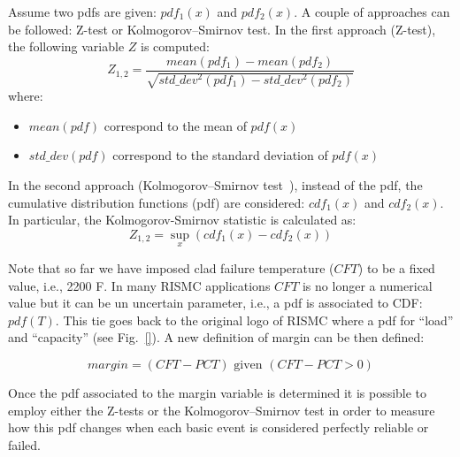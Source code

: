 Assume two pdfs are given: $pdf_1(x)$ and $pdf_2(x)$. A couple of approaches can be followed: Z-test or 
Kolmogorov–Smirnov test. 
In the first approach (Z-test), the following variable $Z$ is computed:
\begin{equation}
  Z_{1,2} = \frac{mean(pdf_1)-mean(pdf_2)}{\sqrt{std\_dev^2 (pdf_1)-std\_dev^2(pdf_2)}} 
  \label{eq:Ztest}
\end{equation}
where:
\begin{itemize}
  \item $mean(pdf)$ correspond to the mean of $pdf(x)$ 
  \item $std\_dev(pdf)$ correspond to the standard deviation of $pdf(x)$ 
\end{itemize}

In the second approach (Kolmogorov–Smirnov test~\cite{}), instead of the pdf, the cumulative 
distribution functions (pdf) are considered: $cdf_1(x)$ and $cdf_2(x)$. 
In particular, the Kolmogorov-Smirnov statistic is calculated as:
\begin{equation}
  Z_{1,2} = \sup_{x} (cdf_1(x) - cdf_2(x))
  \label{eq:Kolmogorov-Smirnov}
\end{equation}

Note that so far we have imposed clad failure temperature ($CFT$) to be a fixed value, 
i.e., 2200 F. 
In many RISMC applications $CFT$ is no longer a numerical value but it can be un uncertain 
parameter, i.e., a pdf is associated to CDF: $pdf(T)$. 
This tie goes back to the original logo of RISMC where a pdf for ``load'' and ``capacity'' 
(see Fig.~\ref{}).
A new definition of margin can be then defined:

\begin{equation}
  margin=(CFT-PCT) \text{ given } (CFT-PCT>0)
  \label{eq:new margin}
\end{equation}

Once the pdf associated to the margin variable is determined it is possible 
to employ either the Z-tests or the Kolmogorov–Smirnov test in order to measure how this pdf 
changes when each basic event is considered perfectly reliable or failed. 

